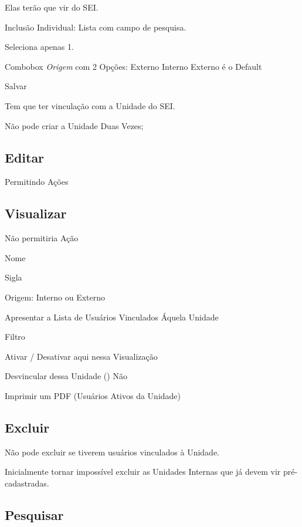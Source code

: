 	Elas terão que vir do SEI.
	
	Inclusão Individual: Lista com campo de pesquisa.
	
	Seleciona apenas 1.
	
	Combobox \emph{Origem} com 2 Opções: Externo Interno
	Externo é o Default
	
	Salvar	
	
	Tem que ter vinculação com a Unidade do SEI.
	
	Não pode criar a Unidade Duas Vezes;
	
	
	\subsection{Editar}
	
	Permitindo Ações
	
	
	
	
	\subsection{Visualizar}
	
	Não permitiria Ação
	
	
	Nome
	
	Sigla
	
	Origem: Interno ou Externo
	
		
	Apresentar a Lista de Usuários Vinculados Áquela Unidade
	
	Filtro
	
	Ativar / Desativar aqui nessa Visualização
	
	Desvincular dessa Unidade () Não
	
	Imprimir um PDF  (Usuários Ativos da Unidade)
	
	
	
	\subsection{Excluir}
	
	Não pode excluir se tiverem usuários vinculados à Unidade.
	
	Inicialmente tornar impossível excluir as Unidades Internas que já devem vir pré-cadastradas.
	
	\subsection{Pesquisar}

